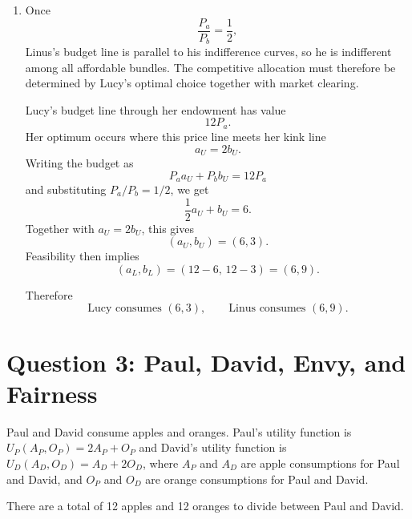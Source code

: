 \documentclass[12pt]{article}
\begin{document}
\begin{enumerate}[label=(\alph*)]
    Hence a competitive equilibrium can exist only if
    \[
    \boxed{\frac{P_a}{P_b}=\frac12.}
    \]

    \item
    Once
    \[
    \frac{P_a}{P_b}=\frac12,
    \]
    Linus's budget line is parallel to his indifference curves, so he is indifferent among all affordable bundles. The competitive allocation must therefore be determined by Lucy's optimal choice together with market clearing.

    Lucy's budget line through her endowment has value
    \[
    12P_a.
    \]
    Her optimum occurs where this price line meets her kink line
    \[
    a_U=2b_U.
    \]
    Writing the budget as
    \[
    P_a a_U + P_b b_U = 12P_a
    \]
    and substituting \(P_a/P_b=1/2\), we get
    \[
    \frac12 a_U+b_U=6.
    \]
    Together with \(a_U=2b_U\), this gives
    \[
    (a_U,b_U)=(6,3).
    \]
    Feasibility then implies
    \[
    (a_L,b_L)=(12-6,\,12-3)=(6,9).
    \]

    Therefore
    \[
    \boxed{\text{Lucy consumes }(6,3),\qquad \text{Linus consumes }(6,9).}
    \]
\end{enumerate}

\newpage
\section{Question 3: Paul, David, Envy, and Fairness}

\noindent
Paul and David consume apples and oranges. Paul's utility function is \(U_P(A_P,O_P)=2A_P+O_P\) and David's utility function is \(U_D(A_D,O_D)=A_D+2O_D\), where \(A_P\) and \(A_D\) are apple consumptions for Paul and David, and \(O_P\) and \(O_D\) are orange consumptions for Paul and David.

\noindent
There are a total of 12 apples and 12 oranges to divide between Paul and David.
\end{document}
